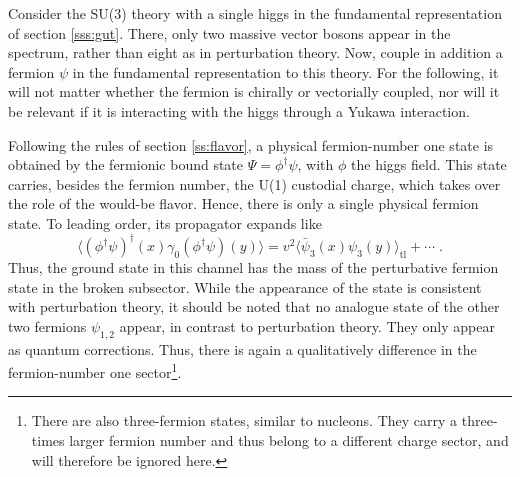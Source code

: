\documentclass[final,12pt]{article}
\newcommand*{\no}{\noindent}
\newcommand*{\be}{\begin{equation}}
\newcommand*{\ee}{\end{equation}}
\newcommand*{\nn}{\nonumber}
\newcommand*{\1}{1\!\!\!\bot}
\begin{document}
Consider the SU(3) theory with a single higgs in the fundamental representation of section \ref{sss:gut}. There, only two massive vector bosons appear in the spectrum, rather than eight as in perturbation theory. Now, couple in addition a fermion $\psi$ in the fundamental representation to this theory. For the following, it will not matter whether the fermion is chirally or vectorially coupled, nor will it be relevant if it is interacting with the higgs through a Yukawa interaction.

Following the rules of section \ref{ss:flavor}, a physical fermion-number one state is obtained by the fermionic bound state $\Psi=\phi^\dagger\psi$, with $\phi$ the higgs field. This state carries, besides the fermion number, the U(1) custodial charge, which takes over the role of the would-be flavor. Hence, there is only a single physical fermion state. To leading order, its propagator expands like
\be
\big\langle(\phi^\dagger\psi)^\dagger(x)\gamma_0(\phi^\dagger\psi)(y)\big\rangle =v^2\big\langle\bar{\psi}_3(x)\psi_3(y)\big\rangle_\mathrm{tl}+\cdots\;\nn.
\ee
\no Thus, the ground state in this channel has the mass of the perturbative fermion state in the broken subsector. While the appearance of the state is consistent with perturbation theory, it should be noted that no analogue state of the other two fermions $\psi_{1,2}$ appear, in contrast to perturbation theory. They only appear as quantum corrections. Thus, there is again a qualitatively difference in the fermion-number one sector\footnote{There are also three-fermion states, similar to nucleons. They carry a three-times larger fermion number and thus belong to a different charge sector, and will therefore be ignored here.}.
\end{document}
